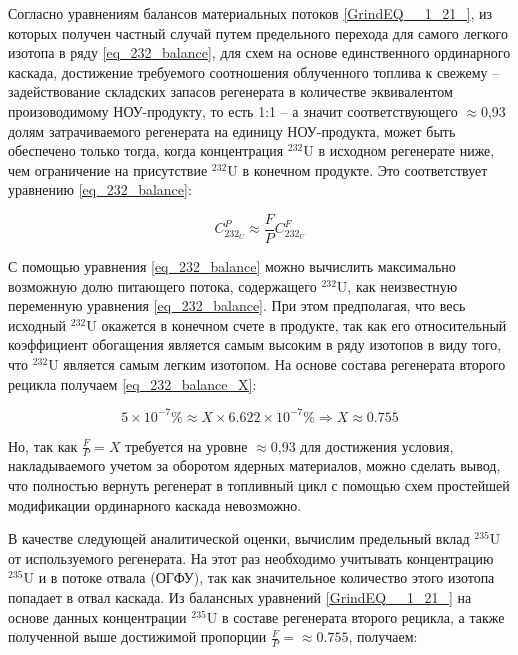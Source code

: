 Согласно уравнениям балансов материальных потоков \ref{GrindEQ__1_21_}, из которых получен частный случай путем предельного перехода для самого легкого изотопа в ряду \ref{eq_232_balance}, для схем на основе единственного ординарного каскада, достижение требуемого соотношения  облученного топлива к свежему -- задействование складских запасов регенерата в количестве эквивалентом произоводимому НОУ-продукту, то есть 1:1 -- а значит соответствующего $\approx$0,93 долям затрачиваемого регенерата на единицу НОУ-продукта, может быть обеспечено только тогда, когда концентрация $^{232}$U в исходном регенерате ниже, чем ограничение на присутствие $^{232}$U в конечном продукте. Это соответствует уравнению \ref{eq_232_balance}:

\begin{equation}
\label{eq_232_balance}
  C_{232_{U}}^{P} \approx \frac{F}{P} C_{232_{U}}^{F}
\end{equation}

С помощью уравнения \ref{eq_232_balance} можно вычислить максимально возможную долю питающего потока, содержащего $^{232}$U, как неизвестную переменную уравнения \ref{eq_232_balance}. При этом предполагая, что весь исходный $^{232}$U окажется в конечном счете в продукте, так как его относительный коэффициент обогащения является самым высоким в ряду изотопов в виду того, что $^{232}$U является самым легким изотопом. На основе состава регенерата второго рецикла получаем \ref{eq_232_balance_X}:

\begin{equation}
  \label{eq_232_balance_X}
    5 \times 10^{-7} \% \approx X \times 6.622 \times 10^{-7} \% \Rightarrow X \approx 0.755
\end{equation}

Но, так как $\frac{F}{P} = X$ требуется на уровне $\approx$0,93 для достижения условия, накладываемого учетом за оборотом ядерных материалов, можно сделать вывод, что полностью вернуть регенерат в топливный цикл с помощью схем простейшей модификации ординарного каскада невозможно.

В качестве следующей аналитической оценки, вычислим предельный вклад $^{235}$U от используемого регенерата. На этот раз необходимо учитывать концентрацию $^{235}$U и в потоке отвала (ОГФУ), так как значительное количество этого изотопа попадает в отвал каскада. Из балансных уравнений \ref{GrindEQ__1_21_} на основе данных концентрации $^{235}$U в составе регенерата второго рецикла, а также полученной выше достижимой пропорции  $\frac{F}{P} = \approx 0.755$, получаем:

